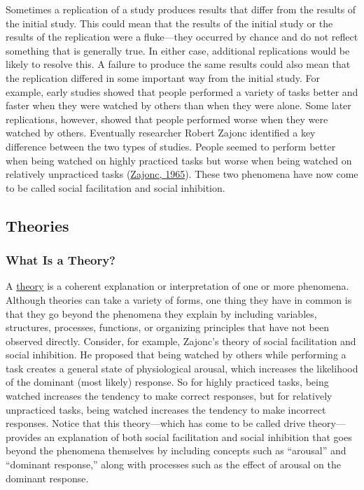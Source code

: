 \documentclass[
]{krantz}
\begin{document}
Sometimes a replication of a study produces results that differ from the results of the initial study. This could mean that the results of the initial study or the results of the replication were a fluke---they occurred by chance and do not reflect something that is generally true. In either case, additional replications would be likely to resolve this. A failure to produce the same results could also mean that the replication differed in some important way from the initial study. For example, early studies showed that people performed a variety of tasks better and faster when they were watched by others than when they were alone. Some later replications, however, showed that people performed worse when they were watched by others. Eventually researcher Robert Zajonc identified a key difference between the two types of studies. People seemed to perform better when being watched on highly practiced tasks but worse when being watched on relatively unpracticed tasks (\protect\hyperlink{ref-zajonc1965social}{Zajonc, 1965}). These two phenomena have now come to be called social facilitation and social inhibition.

\hypertarget{theories}{%
\subsection*{Theories}\label{theories}}


\hypertarget{what-is-a-theory}{%
\subsubsection*{What Is a Theory?}\label{what-is-a-theory}}


A \protect\hyperlink{theory}{theory} is a coherent explanation or interpretation of one or more phenomena. Although theories can take a variety of forms, one thing they have in common is that they go beyond the phenomena they explain by including variables, structures, processes, functions, or organizing principles that have not been observed directly. Consider, for example, Zajonc's theory of social facilitation and social inhibition. He proposed that being watched by others while performing a task creates a general state of physiological arousal, which increases the likelihood of the dominant (most likely) response. So for highly practiced tasks, being watched increases the tendency to make correct responses, but for relatively unpracticed tasks, being watched increases the tendency to make incorrect responses. Notice that this theory---which has come to be called drive theory---provides an explanation of both social facilitation and social inhibition that goes beyond the phenomena themselves by including concepts such as ``arousal'' and ``dominant response,'' along with processes such as the effect of arousal on the dominant response.
\end{document}
